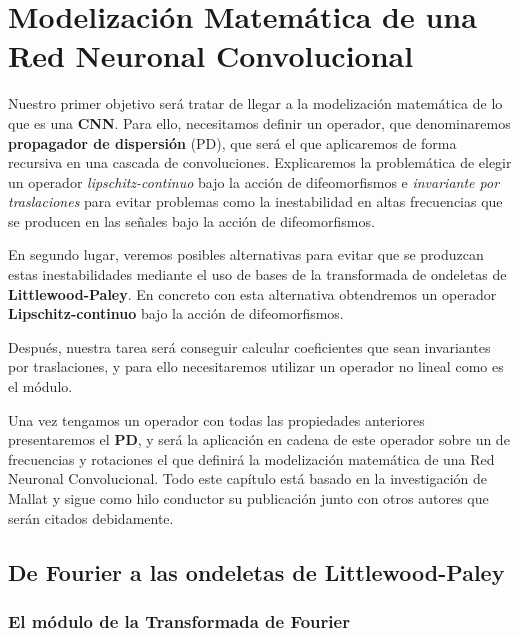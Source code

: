 


\chapter{Modelización Matemática de una Red Neuronal Convolucional} 

\noindent Nuestro primer objetivo será tratar de llegar a la modelización matemática de lo que es una \textbf{CNN}. Para ello, necesitamos definir un operador, que denominaremos \textbf{propagador de dispersión} (PD), que será el que aplicaremos de forma recursiva en una cascada de convoluciones. Explicaremos la problemática de elegir un operador \textit{lipschitz-continuo} bajo la acción de difeomorfismos e \textit{invariante por traslaciones} para evitar problemas como la inestabilidad en altas frecuencias que se producen en las señales bajo la acción de difeomorfismos. 

\medskip

\noindent En segundo lugar,  veremos posibles alternativas para evitar que se produzcan estas inestabilidades mediante el uso de bases de la transformada de ondeletas de \textbf{Littlewood-Paley}. En concreto con esta alternativa obtendremos un operador \textbf{Lipschitz-continuo} bajo la acción de difeomorfismos. 

\medskip

\noindent Después, nuestra tarea será conseguir calcular coeficientes que sean invariantes por traslaciones, y para ello necesitaremos utilizar un operador no lineal como es el módulo. 

\medskip

\noindent Una vez tengamos un operador con todas las propiedades anteriores presentaremos el \textbf{PD}, y será la aplicación en cadena de este operador sobre un  de frecuencias y rotaciones el que definirá la modelización matemática de una Red Neuronal Convolucional. Todo este capítulo está basado en la investigación de Mallat y sigue como hilo conductor su publicación \cite{GroupInvariantScattering} junto con otros autores que serán citados debidamente.


\section{De Fourier a las ondeletas de Littlewood-Paley}

\subsection{El módulo de la Transformada de Fourier}

